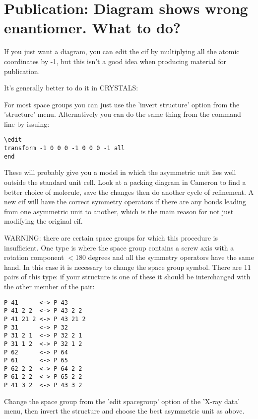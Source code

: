 \documentclass[10pt,a4paper]{report}
\begin{document}
\section{Publication: Diagram shows wrong enantiomer. What to do?}



If you just want a diagram, you can edit the cif by multiplying all the 
atomic coordinates by -1, but this isn't a good idea when producing material 
for publication.



It's generally better to do it in CRYSTALS:



For most space groups you can just use the 'invert structure' option from 
the 'structure' menu. Alternatively you can do the same thing from the 
command line by issuing:
\small\begin{verbatim}
\edit
transform -1 0 0 0 -1 0 0 0 -1 all
end
\end{verbatim}\normalsize


These will probably give you a model in which the asymmetric unit lies well 
outside the standard unit cell. Look at a packing diagram in Cameron to find 
a better choice of molecule, save the changes then do another cycle of 
refinement. A new cif will have the correct symmetry operators if there are 
any bonds leading from one asymmetric unit to another, which is the main 
reason for not just modifying the original cif.



WARNING: there are certain space groups for which this procedure is 
insufficient. One type is where the space group contains a screw axis with a 
rotation component $<$180 degrees and all the symmetry operators have the same 
hand. In this case it is necessary to change the space group symbol. There 
are 11 pairs of this type: if your structure is one of these it should be 
interchanged with the other member of the pair:
\small\begin{verbatim}
P 41      <-> P 43
P 41 2 2  <-> P 43 2 2
P 41 21 2 <-> P 43 21 2
P 31      <-> P 32
P 31 2 1  <-> P 32 2 1
P 31 1 2  <-> P 32 1 2
P 62      <-> P 64
P 61      <-> P 65
P 62 2 2  <-> P 64 2 2
P 61 2 2  <-> P 65 2 2
P 41 3 2  <-> P 43 3 2
\end{verbatim}\normalsize


Change the space group from the 'edit spacegroup' option of the 'X-ray data' 
menu, then invert the structure and choose the best asymmetric unit as 
above.
\end{document}
